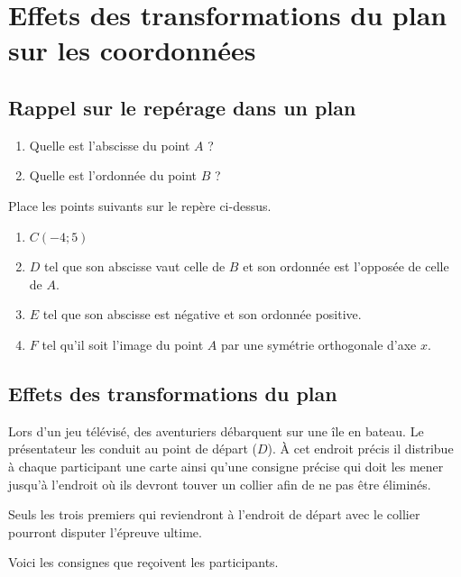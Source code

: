 \documentclass[../math2.tex]{subfiles}
\begin{document}
\section{Effets des transformations du plan sur les coordonnées}
\subsection{Rappel sur le repérage dans un plan}
\begin{center}
    
\end{center}
\begin{exercise}
    \begin{enumerate}
        \item Quelle est l'abscisse du point $A$ ?
        \item Quelle est l'ordonnée du point $B$ ?
    \end{enumerate}
\end{exercise}
\begin{exercise}
    Place les points suivants sur le repère ci-dessus.
    \begin{enumerate}
        \item $C(-4;5)$
        \item $D$ tel que son abscisse vaut celle de $B$ et son ordonnée est l'opposée de celle de $A$.
        \item $E$ tel que son abscisse est négative et son ordonnée positive.
        \item $F$ tel qu'il soit l'image du point $A$ par une symétrie orthogonale d'axe $x$.
    \end{enumerate}
\end{exercise}

\newpage
\subsection{Effets des transformations du plan}
Lors d'un jeu télévisé, des aventuriers débarquent sur une île en bateau.
Le présentateur les conduit au point de départ ($D$). À cet endroit précis il
distribue à chaque participant une carte ainsi qu'une consigne précise qui doit
les mener jusqu'à l'endroit où ils devront touver un collier afin de ne pas
être éliminés.

Seuls les trois premiers qui reviendront à l'endroit de départ avec le collier
pourront disputer l'épreuve ultime.

Voici les consignes que reçoivent les participants.
\end{document}
